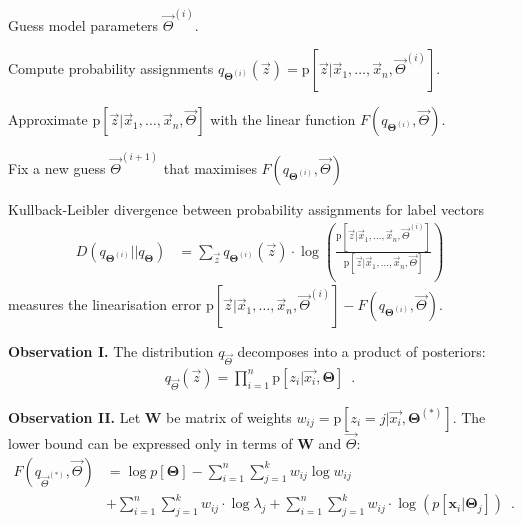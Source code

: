 \documentclass[landscape,footrule]{foils}
\newcommand{\pd}[1]{\mathrm{p}[#1]}
\begin{document}

\begin{triangles}
\item Guess model parameters $\vec{\Theta}^{(i)}$.
\item Compute probability assignments $q_{\boldsymbol{\Theta}^{(i)}}(\vec{z})=\pd{\vec{z}|\vec{x}_1,\ldots,\vec{x}_n, \vec{\Theta}^{(i)}}$.
\item Approximate $\pd{\vec{z}|\vec{x}_1,\ldots,\vec{x}_n, \vec{\Theta}}$ with the linear function $F(q_{\boldsymbol{\Theta}^{(i)}},\vec{\Theta})$.
\item Fix a new guess $\vec{\Theta}^{(i+1)}$ that maximises $F(q_{\boldsymbol{\Theta}^{(i)}},\vec{\Theta})$ 
\end{triangles}
\vspace*{1cm}

Kullback-Leibler divergence between probability assignments for label vectors 
\begin{align*}
D(q_{\boldsymbol{\Theta}^{(i)}}||q_{\boldsymbol{\Theta}})&=\sum_{\vec{z}}q_{\boldsymbol{\Theta}^{(i)}}(\vec{z})\cdot\log\left(\frac{\pd{\vec{z}|\vec{x}_1,\ldots,\vec{x}_n, \vec{\Theta}^{(i)}}}{\pd{\vec{z}|\vec{x}_1,\ldots,\vec{x}_n, \vec{\Theta}}}\right) 
\end{align*}
measures the linearisation error $\pd{\vec{z}|\vec{x}_1,\ldots,\vec{x}_n, \vec{\Theta}^{(i)}}-F(q_{\boldsymbol{\Theta}^{(i)}},\vec{\Theta})$.



\textbf{Observation I.}
The  distribution $q_{\vec{\Theta}}$ decomposes into a product of posteriors:
\begin{align*}
q_{\vec{\Theta}}(\vec{z})=\prod_{i=1}^n \pd{z_i|\vec{x_i},\boldsymbol{\Theta}}\enspace.
\end{align*}\vspace*{-3ex}
 
\textbf{Observation II.}
Let $\boldsymbol{W}$ be matrix of weights $w_{ij}=\pd{z_i=j|\vec{x_i},\boldsymbol{\Theta}^{(*)}}$. 
The lower bound can be expressed only in terms of $\boldsymbol{W}$ and $\vec{\Theta}$:
\begin{align*}
F(q_{\vec{\Theta}^{(*)}},\vec{\Theta})
&=\log p[\boldsymbol{\Theta}] -
\sum_{i=1}^n \sum_{j=1}^k w_{ij}\log w_{ij}\\
&+
\sum_{i=1}^n \sum_{j=1}^k w_{ij}\cdot \log\lambda_j
+
\sum_{i=1}^n 
\sum_{j=1}^k w_{ij}\cdot \log\left(p[\boldsymbol{x}_i|\boldsymbol{\Theta}_j]\right)\enspace.
\end{align*}
\end{document}
